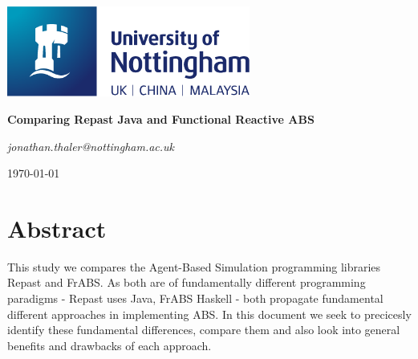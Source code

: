 \documentclass[oneside]{book}
\begin{document}
\begin{titlepage}
	\centering
	\includegraphics[width=0.60\textwidth]{../../logo/UoN_Primary_Logo_RGB.png}\par\vspace{1cm}
	\vspace{1.5cm}
	{\huge\bfseries Comparing Repast Java and Functional Reactive ABS \par}
	\vspace{2cm}
	{\Large\itshape jonathan.thaler@nottingham.ac.uk \par}
	\vfill
	
	\vfill

	{\large \today\par}
\end{titlepage}

\cleardoublepage

\section*{Abstract}
This study we compares the Agent-Based Simulation programming libraries Repast and FrABS. As both are of fundamentally different programming paradigms - Repast uses Java, FrABS Haskell - both propagate fundamental different approaches in implementing ABS. In this document we seek to precicesly identify these fundamental differences, compare them and also look into general benefits and drawbacks of each approach.

\clearpage
\tableofcontents
\clearpage











\renewcommand\bibname{References}



\end{document}
